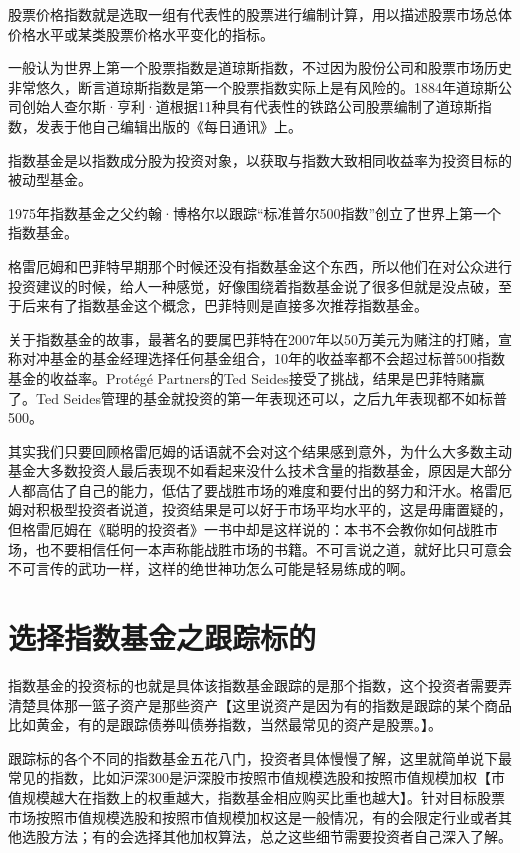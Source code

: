 \documentclass[12pt,oneside]{book}
\begin{document}
股票价格指数就是选取一组有代表性的股票进行编制计算，用以描述股票市场总体价格水平或某类股票价格水平变化的指标。

一般认为世界上第一个股票指数是道琼斯指数，不过因为股份公司和股票市场历史非常悠久，断言道琼斯指数是第一个股票指数实际上是有风险的。1884年道琼斯公司创始人查尔斯·亨利·道根据11种具有代表性的铁路公司股票编制了道琼斯指数，发表于他自己编辑出版的《每日通讯》上。

指数基金是以指数成分股为投资对象，以获取与指数大致相同收益率为投资目标的被动型基金。

1975年指数基金之父约翰·博格尔以跟踪“标准普尔500指数”创立了世界上第一个指数基金。

格雷厄姆和巴菲特早期那个时候还没有指数基金这个东西，所以他们在对公众进行投资建议的时候，给人一种感觉，好像围绕着指数基金说了很多但就是没点破，至于后来有了指数基金这个概念，巴菲特则是直接多次推荐指数基金。

关于指数基金的故事，最著名的要属巴菲特在2007年以50万美元为赌注的打赌，宣称对冲基金的基金经理选择任何基金组合，10年的收益率都不会超过标普500指数基金的收益率。Protégé Partners的Ted Seides接受了挑战，结果是巴菲特赌赢了。Ted Seides管理的基金就投资的第一年表现还可以，之后九年表现都不如标普500。

其实我们只要回顾格雷厄姆的话语就不会对这个结果感到意外，为什么大多数主动基金大多数投资人最后表现不如看起来没什么技术含量的指数基金，原因是大部分人都高估了自己的能力，低估了要战胜市场的难度和要付出的努力和汗水。格雷厄姆对积极型投资者说道，投资结果是可以好于市场平均水平的，这是毋庸置疑的，但格雷厄姆在《聪明的投资者》一书中却是这样说的：本书不会教你如何战胜市场，也不要相信任何一本声称能战胜市场的书籍。不可言说之道，就好比只可意会不可言传的武功一样，这样的绝世神功怎么可能是轻易练成的啊。


\section{选择指数基金之跟踪标的}
指数基金的投资标的也就是具体该指数基金跟踪的是那个指数，这个投资者需要弄清楚具体那一篮子资产是那些资产【这里说资产是因为有的指数是跟踪的某个商品比如黄金，有的是跟踪债券叫债券指数，当然最常见的资产是股票。】。

跟踪标的各个不同的指数基金五花八门，投资者具体慢慢了解，这里就简单说下最常见的指数，比如沪深300是沪深股市按照市值规模选股和按照市值规模加权【市值规模越大在指数上的权重越大，指数基金相应购买比重也越大】。针对目标股票市场按照市值规模选股和按照市值规模加权这是一般情况，有的会限定行业或者其他选股方法；有的会选择其他加权算法，总之这些细节需要投资者自己深入了解。
\end{document}
